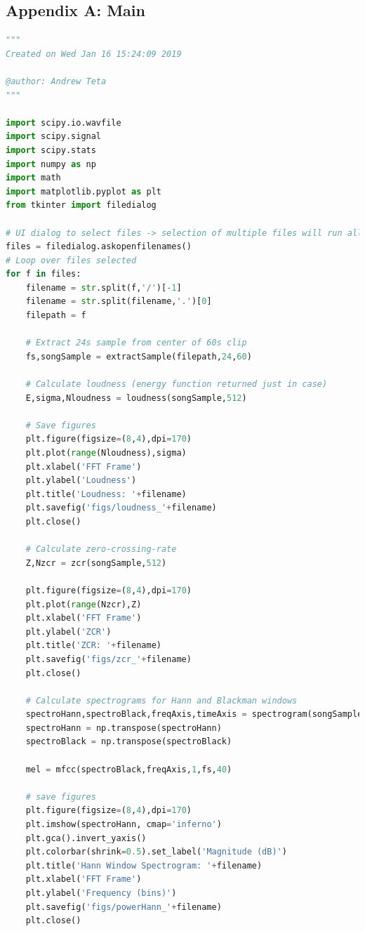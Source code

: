 \documentclass[11pt,a4paper]{article}
\begin{document}
\subsection{Appendix A: Main} \label{app:main}
	\begin{lstlisting}[language=Python,label={lst:main}]
"""
Created on Wed Jan 16 15:24:09 2019

@author: Andrew Teta
"""

import scipy.io.wavfile
import scipy.signal
import scipy.stats
import numpy as np
import math
import matplotlib.pyplot as plt
from tkinter import filedialog

# UI dialog to select files -> selection of multiple files will run all functions for each file
files = filedialog.askopenfilenames()
# Loop over files selected
for f in files:
    filename = str.split(f,'/')[-1]
    filename = str.split(filename,'.')[0]
    filepath = f

    # Extract 24s sample from center of 60s clip
    fs,songSample = extractSample(filepath,24,60)

    # Calculate loudness (energy function returned just in case)
    E,sigma,Nloudness = loudness(songSample,512)

    # Save figures
    plt.figure(figsize=(8,4),dpi=170)
    plt.plot(range(Nloudness),sigma)
    plt.xlabel('FFT Frame')
    plt.ylabel('Loudness')
    plt.title('Loudness: '+filename)
    plt.savefig('figs/loudness_'+filename)
    plt.close()

    # Calculate zero-crossing-rate
    Z,Nzcr = zcr(songSample,512)

    plt.figure(figsize=(8,4),dpi=170)
    plt.plot(range(Nzcr),Z)
    plt.xlabel('FFT Frame')
    plt.ylabel('ZCR')
    plt.title('ZCR: '+filename)
    plt.savefig('figs/zcr_'+filename)
    plt.close()

    # Calculate spectrograms for Hann and Blackman windows
    spectroHann,spectroBlack,freqAxis,timeAxis = spectrogram(songSample,fs,512)
    spectroHann = np.transpose(spectroHann)
    spectroBlack = np.transpose(spectroBlack)

    mel = mfcc(spectroBlack,freqAxis,1,fs,40)

    # save figures
    plt.figure(figsize=(8,4),dpi=170)
    plt.imshow(spectroHann, cmap='inferno')
    plt.gca().invert_yaxis()
    plt.colorbar(shrink=0.5).set_label('Magnitude (dB)')
    plt.title('Hann Window Spectrogram: '+filename)
    plt.xlabel('FFT Frame')
    plt.ylabel('Frequency (bins)')
    plt.savefig('figs/powerHann_'+filename)
    plt.close()


\end{lstlisting}
\end{document}
